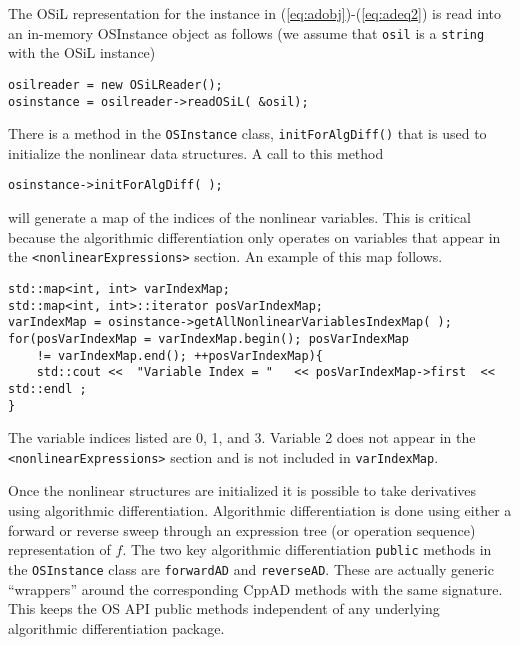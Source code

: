 \documentclass[11pt]{article}
\renewcommand{\_}{{\char"5F}}
\renewcommand{\{}{{\char"7B}}
\renewcommand{\}}{{\char"7D}}
\renewcommand{\^}{{\char"0D}}
\renewcommand{\'}{{\char"0D}}
\begin{document}
The OSiL representation for the instance  in  (\ref{eq:adobj})-(\ref{eq:adeq2})  is read into an in-memory OSInstance object as follows (we assume that {\tt osil} is a {\tt string} with the OSiL instance)
\begin{verbatim}
osilreader = new OSiLReader();
osinstance = osilreader->readOSiL( &osil);
\end{verbatim} 
There is a method in the {\tt OSInstance} class, {\tt initForAlgDiff()} that is used to initialize the nonlinear data structures.  A call to this method
\begin{verbatim}
osinstance->initForAlgDiff( );
\end{verbatim}  
will generate a map of the indices of the nonlinear variables. This is critical because the algorithmic differentiation only operates on variables that appear in the {\tt <nonlinearExpressions>} section.  An example of this map follows.
\begin{verbatim}
std::map<int, int> varIndexMap;
std::map<int, int>::iterator posVarIndexMap;
varIndexMap = osinstance->getAllNonlinearVariablesIndexMap( );
for(posVarIndexMap = varIndexMap.begin(); posVarIndexMap 
	!= varIndexMap.end(); ++posVarIndexMap){
	std::cout <<  "Variable Index = "   << posVarIndexMap->first  << std::endl ;
}
\end{verbatim}
The variable indices listed are 0, 1, and 3. Variable 2 does not appear in the {\tt <nonlinearExpressions>} section and is not included in {\tt varIndexMap}. 

Once the nonlinear structures are initialized it is possible to take derivatives using algorithmic differentiation.   Algorithmic differentiation is done using either a forward or reverse sweep through an expression tree (or operation sequence) representation of $f$.  The two key algorithmic differentiation {\tt public} methods in the {\tt OSInstance} class are {\tt forwardAD} and {\tt reverseAD}.   These are actually  generic ``wrappers'' around the corresponding CppAD methods with the same signature.  This keeps the OS API  public methods independent of any underlying algorithmic differentiation package. 
\end{document}
